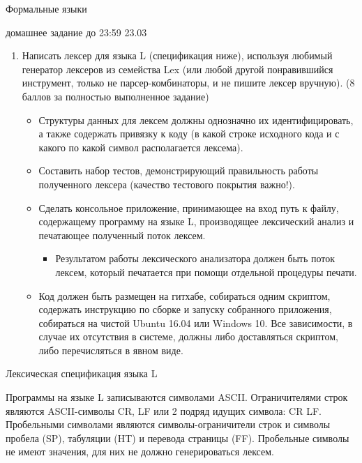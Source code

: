 \documentclass{article}
\begin{document}
\begin{center} {\LARGE Формальные языки} \end{center}

\begin{center} {\Large домашнее задание до 23:59 23.03} \end{center}
\bigskip

\begin{enumerate}
  \item Написать лексер для языка L (спецификация ниже), используя любимый генератор лексеров из семейства Lex (или любой другой понравившийся инструмент, только не парсер-комбинаторы, и не пишите лексер вручную). (8 баллов за полностью выполненное задание)
    \begin{itemize}
        \item Структуры данных для лексем должны однозначно их идентифицировать, а также содержать привязку к коду (в какой строке исходного кода и с какого по какой символ располагается лексема). 
        \item Составить набор тестов, демонстрирующий правильность работы полученного лексера (качество тестового покрытия важно!).
        \item Сделать консольное  приложение, принимающее на вход путь к файлу, содержащему программу на языке L, производящее лексический анализ и печатающее полученный поток лексем.
        \begin{itemize}
            \item Результатом работы лексического анализатора должен быть поток лексем, который печатается при помощи отдельной процедуры печати. 
        \end{itemize}
        \item Код должен быть размещен на гитхабе, собираться одним скриптом, содержать инструкцию по сборке и запуску собранного приложения, собираться на чистой Ubuntu 16.04 или Windows 10. Все зависимости, в случае их отсутствия в системе, должны либо доставляться скриптом, либо перечисляться в явном виде. 
     \end{itemize}
\end{enumerate}

\bigskip

\begin{center} {\Large Лексическая спецификация языка L } \end{center}

\medskip

Программы на языке L записываются символами ASCII. Ограничителями строк являются ASCII-символы CR, LF или 2 подряд идущих символа: CR LF. Пробельными символами являются символы-ограничители строк и символы пробела (SP), табуляции (HT) и перевода страницы (FF). Пробельные символы не имеют значения, для них не должно генерироваться лексем. 
\end{document}
